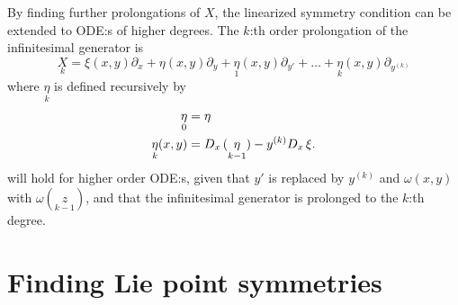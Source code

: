 By finding further prolongations of \(X\), the linearized symmetry condition can be extended to ODE:s of higher degrees.
The \(k\):th order prolongation of the infinitesimal generator is
\begin{equation}
  \underset{k}{X} = \xi(x,y) \partial_x + \eta(x,y) \partial_y + \underset{1}{\eta}(x,y) \partial_{y'} + \dots + \underset{k}{\eta}(x,y) \partial_{y^{(k)}}
\end{equation}
where \(\underset{k}{\eta}\) is defined recursively by
\begin{align}
  \underset{0}{\eta} &= \eta\\
  \underset{k}{\eta}(x,y) &= D_{x}\,(\underset{k-1}{\eta}) - y^{(k)} D_{x}\, \xi.
\end{align}
 will hold for higher order ODE:s, given that \(y'\) is replaced by \(y^{(k)}\) and \(\omega(x,y)\) with \(\omega(\underset{k-1}{z})\), and that the infinitesimal generator is prolonged to the \(k\):th degree.

\section{Finding Lie point symmetries}

